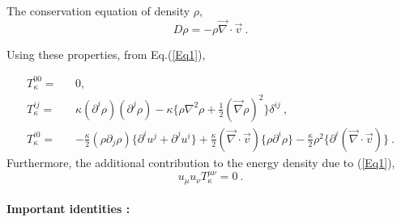 \documentclass[a4paper,10pt]{article}
\begin{document}
The conservation equation of density $\rho$,
\begin{equation}
 D\rho=-\rho \vec{\nabla}\cdot\vec{v}~.
 \label{rho}
\end{equation}


Using these properties, from Eq.(\ref{Eq1}),

\begin{eqnarray}
 T_{\kappa}^{00}=&&0,\\
 T_{\kappa}^{ij}=&&\kappa(\partial^i \rho)(\partial^j \rho)-\kappa\big\{\rho\nabla^2\rho+\frac{1}{2}(\vec{\nabla}\rho)^2\big\}\delta^{ij}~,\\
 T_{\kappa}^{i0}=&&-\frac{\kappa}{2}(\rho\partial_j\rho)\big\{\partial^{i}u^j+\partial^j u^{i}\big\}+\frac{\kappa}{2}(\vec{\nabla}\cdot\vec{v})\big\{\rho\partial^{i}\rho\big\}-\frac{\kappa}{2}\rho^2\big\{\partial^i(\vec{\nabla}\cdot\vec{v})\big\}~.
\end{eqnarray}
Furthermore, the additional contribution to the energy density due to (\ref{Eq1}),
\begin{equation}
 u_{\mu}u_{\nu}T_{\kappa}^{\mu\nu}=0~.
\end{equation}
\\
{\bf{Important identities :}}
\end{document}
